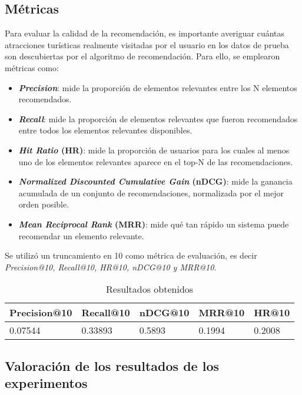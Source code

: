 \documentclass[runningheads]{llncs}
\begin{document}
\subsection{Métricas}
Para evaluar la calidad de la recomendación, es importante averiguar cuántas atracciones turísticas realmente visitadas por el usuario en los datos de prueba son descubiertas por el algoritmo de recomendación. Para ello, se emplearon métricas como:

\begin{itemize}
    \item \textbf{\textit{Precision}}: mide la proporción de elementos relevantes entre los N elementos recomendados.
    \item \textbf{\textit{Recall}}: mide la proporción de elementos relevantes que fueron recomendados entre todos los elementos relevantes disponibles.
    \item \textbf{\textit{Hit Ratio} (HR)}: mide la proporción de usuarios para los cuales al menos uno de los elementos relevantes aparece en el top-N de las recomendaciones.
    \item \textbf{\textit{Normalized Discounted Cumulative Gain} (nDCG)}: mide la ganancia acumulada de un conjunto de recomendaciones, normalizada por el mejor orden posible.
     \item \textbf{\textit{ Mean Reciprocal Rank} (MRR)}: mide qué tan rápido un sistema puede recomendar un elemento relevante.
\end{itemize}

Se utilizó un  truncamiento en 10 como métrica de evaluación, es decir \textit{Precision@10, Recall@10, HR@10, nDCG@10 y MRR@10}.

\begin{table}[h]
    \centering
    \caption{Resultados obtenidos}\label{tab1}
    \begin{tabular}{|l|l|l|l|l|}
        \hline
            Precision@10 & Recall@10 & nDCG@10 & MRR@10 & HR@10\\
        \hline
            0.07544 & 0.33893 & 0.5893 & 0.1994 & 0.2008\\
        \hline
    \end{tabular}
\end{table}

\subsection{Valoración de los resultados de los experimentos}
\end{document}
